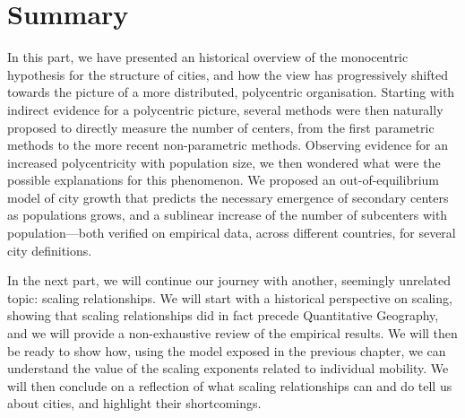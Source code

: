 \section{Summary}
\label{sec:summary}

In this part, we have presented an historical overview of the monocentric
hypothesis for the structure of cities, and how the view has progressively
shifted towards the picture of a more distributed, polycentric organisation.
Starting with indirect evidence for a polycentric picture, several methods were
then naturally proposed to directly measure the number of centers, from the
first parametric methods to the more recent non-parametric methods. Observing
evidence for an increased polycentricity with population size, we then wondered
what were the possible explanations for this phenomenon. We proposed an
out-of-equilibrium model of city growth that predicts the necessary emergence of
secondary centers as populations grows, and a sublinear increase of the number
of subcenters with population---both verified on empirical data, across
different countries, for several city definitions.

In the next part, we will continue our journey with another, seemingly unrelated
topic: scaling relationships. We will start with a historical perspective on
scaling, showing that scaling relationships did in fact precede Quantitative
Geography, and we will provide a non-exhaustive review of the empirical results.
We will then be ready to show how, using the model exposed in the previous chapter, we
can understand the value of the scaling exponents related to individual mobility. We will
then conclude on a reflection of what scaling relationships can and do tell us
about cities, and highlight their shortcomings.

